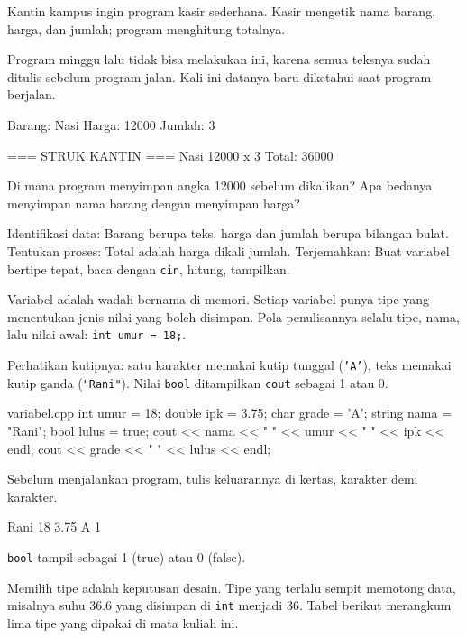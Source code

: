 \documentclass[a4paper]{article}
\begin{document}
Kantin kampus ingin program kasir sederhana. Kasir mengetik nama barang, harga, dan jumlah; program menghitung totalnya.

Program minggu lalu tidak bisa melakukan ini, karena semua teksnya sudah ditulis sebelum program jalan. Kali ini datanya baru diketahui saat program berjalan.

\begin{MKeluaran}[title={Tampilan yang diinginkan}]
Barang: Nasi
Harga: 12000
Jumlah: 3

=== STRUK KANTIN ===
Nasi
12000 x 3
Total: 36000
\end{MKeluaran}
\begin{Tebak}
Di mana program menyimpan angka 12000 sebelum dikalikan? Apa bedanya menyimpan nama barang dengan menyimpan harga?
\end{Tebak}
\begin{Jawaban}
Identifikasi data: Barang berupa teks, harga dan jumlah berupa bilangan bulat. Tentukan proses: Total adalah harga dikali jumlah. Terjemahkan: Buat variabel bertipe tepat, baca dengan \texttt{cin}, hitung, tampilkan.
\end{Jawaban}
Variabel adalah wadah bernama di memori. Setiap variabel punya tipe yang menentukan jenis nilai yang boleh disimpan. Pola penulisannya selalu tipe, nama, lalu nilai awal: \texttt{int umur = 18;}.

Perhatikan kutipnya: satu karakter memakai kutip tunggal (\texttt{'A'}), teks memakai kutip ganda (\texttt{"Rani"}). Nilai \texttt{bool} ditampilkan \texttt{cout} sebagai 1 atau 0.

\begin{MKode}{variabel.cpp}
int umur = 18;
double ipk = 3.75;
char grade = 'A';
string nama = "Rani";
bool lulus = true;
cout << nama << " " << umur << " " << ipk << endl;
cout << grade << " " << lulus << endl;
\end{MKode}
\begin{Tebak}[]
Sebelum menjalankan program, tulis keluarannya di kertas, karakter demi karakter.
\end{Tebak}
\begin{Jawaban}[]
\begin{MKeluaran}[]
Rani 18 3.75
A 1
\end{MKeluaran}
\texttt{bool} tampil sebagai 1 (true) atau 0 (false).
\end{Jawaban}
Memilih tipe adalah keputusan desain. Tipe yang terlalu sempit memotong data, misalnya suhu 36.6 yang disimpan di \texttt{int} menjadi 36. Tabel berikut merangkum lima tipe yang dipakai di mata kuliah ini.
\end{document}
